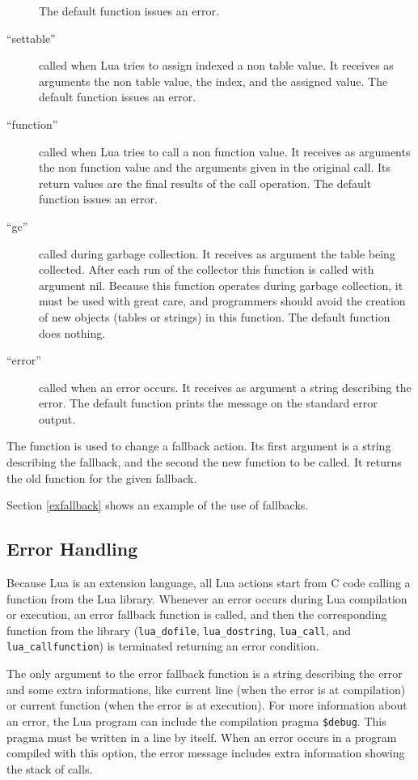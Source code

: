 \begin{description}
The default function issues an error.
\item[``settable'']
called when Lua tries to assign indexed a non table value.
It receives as arguments the non table value,
the index, and the assigned value.
The default function issues an error.
\item[``function'']
called when Lua tries to call a non function value.
It receives as arguments the non function value and the
arguments given in the original call.
Its return values are the final results of the call operation.
The default function issues an error.
\item[``gc'']
called during garbage collection.
It receives as argument the table being collected.
After each run of the collector this function is called with argument nil.
Because this function operates during garbage collection,
it must be used with great care,
and programmers should avoid the creation of new objects
(tables or strings) in this function.
The default function does nothing.
\item[``error'']
called when an error occurs.
It receives as argument a string describing the error.
The default function prints the message on the standard error output.
\end{description}

The function  is used to change a fallback action.
Its first argument is a string describing the fallback,
and the second the new function to be called.
It returns the old function for the given fallback.

Section \ref{exfallback} shows an example of the use of fallbacks.


\subsection{Error Handling} \label{error}

Because Lua is an extension language,
all Lua actions start from C code calling a function from the Lua library.
Whenever an error occurs during Lua compilation or execution,
an error fallback function is called,
and then the corresponding function from the library
(\verb'lua_dofile', \verb'lua_dostring',
\verb'lua_call', and \verb'lua_callfunction')
is terminated returning an error condition.

The only argument to the error fallback function is a string describing
the error and some extra informations,
like current line (when the error is at compilation)
or current function (when the error is at execution).
For more information about an error,
the Lua program can include the compilation pragma \verb'$debug'.
This pragma must be written in a line by itself.
When an error occurs in a program compiled with this option,
the error message includes extra information showing the stack of calls.

